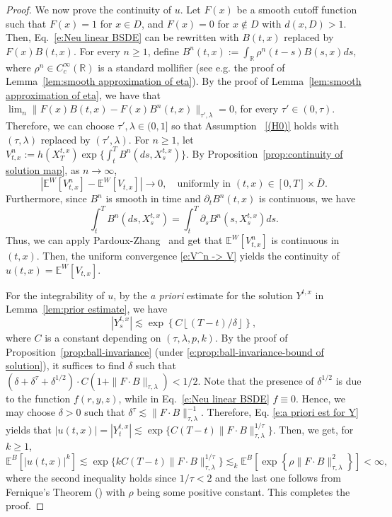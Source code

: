 \documentclass[11pt,reqno]{amsart}
\def\R{\mathbb R}
\def\E{\mathbb E}
\numberwithin{equation}{section}
\begin{document}
\begin{proof}
We now prove the continuity of $u$.  Let $F(x)$ be a smooth cutoff function such that $F(x)=1$ for $x\in D$, and $F(x)=0$ for  $x\notin D$ with $d(x,D)>1$. Then, Eq.~\eqref{e:Neu linear BSDE} can be rewritten with $B(t,x)$ replaced by $F(x)B(t,x)$. For every $n\ge 1$, define $B^{n}(t,x) := \int_{\R}\rho^{n}(t-s)B(s,x)ds,$ where $\rho^n\in C^{\infty}_{c}(\R)$ is a standard mollifier (see e.g. the proof of Lemma~\ref{lem:smooth approximation of eta}). By the proof of Lemma~\ref{lem:smooth approximation of eta}, we have that $\lim_{n}\|F(x)B(t,x) - F(x)B^{n}(t,x)\|_{\tau',\lambda} = 0$, for every $\tau'\in(0,\tau)$. Therefore, we can choose $\tau',\lambda\in(0,1]$ so that Assumption~ \ref{(H0)} holds with $(\tau,\lambda)$ replaced by $(\tau',\lambda)$. For $n\ge 1$, let $V^{n}_{t,x} := h(X^{t,x}_{T})\exp\{\int_{t}^{T}B^{n}(ds,X^{t,x}_{s})\}$. By Proposition~\ref{prop:continuity of solution map}, as $n\to \infty$,
\begin{equation}\label{e:V^n -> V}
\left|\mathbb{E}^{W}\left[V^{n}_{t,x}\right] - \mathbb{E}^{W}\left[V_{t,x}\right]\right| \rightarrow 0,\quad \text{uniformly in }(t,x)\in[0,T]\times\bar{D}.
\end{equation}
Furthermore, since $B^{n}$ is smooth in time and $\partial_{t} B^{n}(t,x)$ is continuous, we have $$\int_{t}^{T}B^{n}(ds,X^{t,x}_{s}) = \int_{t}^{T}\partial_{s}B^{n}(s,X^{t,x}_{s})ds.$$ 
Thus, we can apply Pardoux-Zhang~\cite[Proposition~4.1]{PardouxZhanggeneralized} and get that $\mathbb{E}^{W}\left[V^{n}_{t,x}\right]$ is continuous in $(t,x)$. Then, the uniform convergence \eqref{e:V^n -> V} yields the continuity of  $u(t,x)=\E^W[V_{t,x}]$.

For the integrability of $u$, by the \emph{a priori} estimate for the solution $Y^{t,x}$ in Lemma~\ref{lem:prior estimate}, we have 
\begin{equation}\label{e:a priori est for Y}
|Y^{t,x}_{s}| \lesssim \exp\left\{C \left\lfloor (T - t)/\delta \right\rfloor \right\},
\end{equation}
where $C$ is a constant depending on $(\tau,\lambda,p,k)$. By the proof of Proposition~\ref{prop:ball-invariance} (under \eqref{e:prop:ball-invariance-bound of solution}), it suffices to find $\delta$ such that  $(\delta + \delta^{\tau} + \delta^{1/2})\cdot C (1 + \|F\cdot B\|_{\tau,\lambda})<1/2$. Note that the presence of $\delta^{1/2}$ is due to  the  function $f(r,y,z)$, while in Eq.~\eqref{e:Neu linear BSDE} $f\equiv 0$. Hence, we may choose $\delta>0$ such that $\delta^{\tau} \lesssim \|F\cdot B\|^{-1}_{\tau,\lambda}$. Therefore, Eq. \eqref{e:a priori est for Y} yields that $|u(t,x)| =  |Y^{t,x}_{t}| \lesssim \exp\{C  (T-t) \|F\cdot B\|^{1/\tau}_{\tau,\lambda} \}$.
Then, we get, for $k\ge 1$,
\begin{equation*}
\E^B[|u(t,x)|^k] \lesssim \exp\Big\{k C  (T-t) \|F\cdot B\|^{1/\tau}_{\tau,\lambda} \Big\} \lesssim_k \E^B\left[\exp\left\{\rho \|F\cdot B\|^2_{\tau,\lambda}\right\}\right]<\infty,
\end{equation*}
where the second inequality holds since $1/\tau<2$ and the last one  follows from Fernique's Theorem (\cite{fernique}) with  $\rho$ being some positive constant. This completes the proof.
\end{proof}
\end{document}
